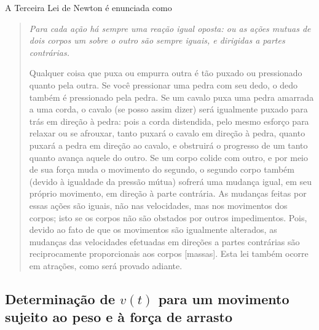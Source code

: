 A Terceira Lei de Newton é enunciada como
\begin{quote}
\emph{Para cada ação há sempre uma reação igual oposta: ou as ações mutuas de dois corpos um sobre o outro são sempre iguais, e dirigidas a partes contrárias.}

Qualquer coisa que puxa ou empurra outra é tão puxado ou pressionado quanto pela outra. Se você pressionar uma pedra com seu dedo, o dedo também é pressionado pela pedra. Se um cavalo puxa uma pedra amarrada a uma corda, o cavalo (se posso assim dizer) será igualmente puxado para trás em direção à pedra: pois a corda distendida, pelo mesmo esforço para relaxar ou se afrouxar, tanto puxará o cavalo em direção à pedra, quanto puxará a pedra em direção ao cavalo, e obstruirá o progresso de um tanto quanto avança aquele do outro. Se um corpo colide com outro, e por meio de sua força muda o movimento do segundo, o segundo corpo também (devido à igualdade da pressão mútua) sofrerá uma mudança igual, em seu próprio movimento, em direção à parte contrária. As mudanças feitas por essas ações são iguais, não nas velocidades, mas nos movimentos dos corpos; isto se os corpos não são obstados por outros impedimentos. Pois, devido ao fato de que os movimentos são igualmente alterados, as mudanças das velocidades efetuadas em direções a partes contrárias são reciprocamente proporcionais aos corpos [massas]. Esta lei também ocorre em atrações, como será provado adiante.
\end{quote}

\subsection{Determinação de $v(t)$ para um movimento sujeito ao peso e à força de arrasto}

